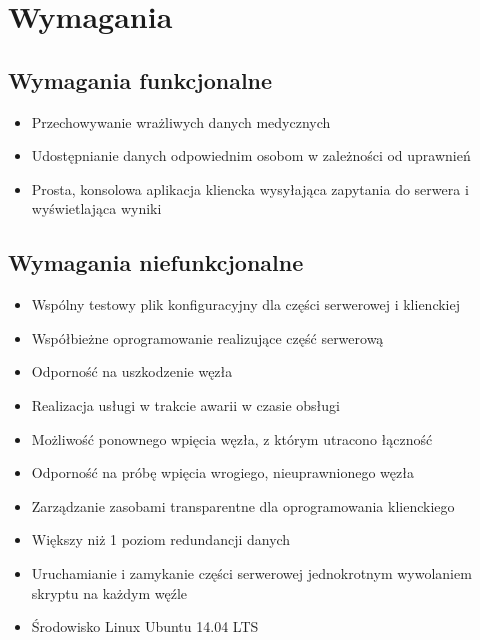 \chapter{Wymagania}



\section{Wymagania funkcjonalne}

\begin{itemize}
\item Przechowywanie wrażliwych danych medycznych
\item Udostępnianie danych odpowiednim osobom w zależności od uprawnień
\item Prosta, konsolowa aplikacja kliencka wysyłająca zapytania do serwera i wyświetlająca wyniki
\end{itemize}

\section{Wymagania niefunkcjonalne}

\begin{itemize}
\item Wspólny testowy plik konfiguracyjny dla części serwerowej i klienckiej
\item Współbieżne oprogramowanie realizujące część serwerową
\item Odporność na uszkodzenie węzła
\item Realizacja usługi w trakcie awarii w czasie obsługi
\item Możliwość ponownego wpięcia węzła, z którym utracono łączność
\item Odporność na próbę wpięcia wrogiego, nieuprawnionego węzła
\item Zarządzanie zasobami transparentne dla oprogramowania klienckiego
\item Większy niż 1 poziom redundancji danych
\item Uruchamianie i zamykanie części serwerowej jednokrotnym wywolaniem skryptu na każdym węźle
\item Środowisko Linux Ubuntu 14.04 LTS
\end{itemize}